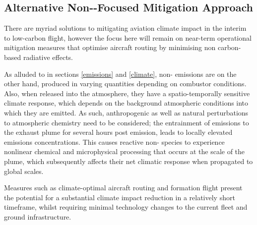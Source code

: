 

\subsection{Alternative Non-\texorpdfstring{}{CO2}-Focused Mitigation Approach}
There are myriad solutions to mitigating aviation climate impact in the interim to low-carbon flight, however the focus here will remain on near-term operational mitigation measures that optimise aircraft routing by minimising non carbon-based radiative effects. 

As alluded to in sections \ref{emissions} and \ref{climate}, non- emissions are on the other hand, produced in varying quantities depending on combustor conditions. Also, when released into the atmosphere, they have a spatio-temporally sensitive climate response, which depends on the background atmospheric conditions into which they are emitted. As such, anthropogenic as well as natural perturbations to atmospheric chemistry need to be considered; the entrainment of emissions to the exhaust plume for several hours post emission, leads to locally elevated emissions concentrations. This causes reactive non- species to experience nonlinear chemical and microphysical processing that occurs at the scale of the plume, which subsequently affects their net climatic response when propagated to global scales.

Measures such as climate-optimal aircraft routing and formation flight present the potential for a substantial climate impact reduction in a relatively short timeframe, whilst requiring minimal technology changes to the current fleet and ground infrastructure.



